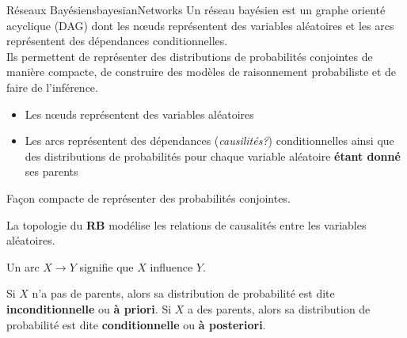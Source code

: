 \begin{definition}{Réseaux Bayésiens}{bayesianNetworks}
    Un réseau bayésien est un graphe orienté acyclique (DAG) dont les nœuds représentent des variables aléatoires et les arcs représentent des dépendances conditionnelles.\\
    Ils permettent de représenter des distributions de probabilités conjointes de manière compacte, de construire des modèles de raisonnement probabiliste et de faire de l'inférence.
    \begin{itemize}
        \item Les nœuds représentent des variables aléatoires
        \item Les arcs représentent des dépendances (\textit{causilités?}) conditionnelles ainsi que des distributions de probabilités pour chaque variable aléatoire \textbf{étant donné} ses parents
    \end{itemize}
    Façon compacte de représenter des probabilités conjointes.
    
\end{definition}


La topologie du \textbf{RB} modélise les relations de causalités entre les variables aléatoires. 

Un arc $X \rightarrow Y$ signifie que $X$ influence $Y$.

Si $X$ n'a pas de parents, alors sa distribution de probabilité est dite \textbf{inconditionnelle} ou \textbf{à priori}.
Si $X$ a des parents, alors sa distribution de probabilité est dite \textbf{conditionnelle} ou \textbf{à posteriori}.


